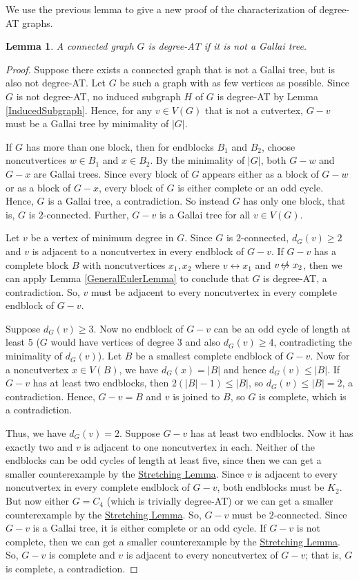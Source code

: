 \documentclass[12pt]{article}
\theoremstyle{plain}
\newtheorem{lem}[thm]{Lemma}
\theoremstyle{definition}
\theoremstyle{remark}
\newcommand{\set}[1]{\left\{ #1 \right\}}
\def\adj{\leftrightarrow}
\def\nonadj{\not\!\leftrightarrow}
\begin{document}
We use the previous lemma to give a new proof of the characterization of
degree-AT graphs.
\begin{lem}
\label{DegreeATClassification}
A connected graph $G$ is degree-AT if it is not a Gallai tree.
\end{lem}
\begin{proof}
Suppose there exists a connected graph that is not a Gallai tree, but is also not
degree-AT.  Let $G$ be such a graph with as few vertices as possible.
Since $G$ is not degree-AT, no induced subgraph $H$ of $G$ is
degree-AT by Lemma \ref{InducedSubgraph}. 
Hence, for any $v \in V(G)$ that is not a cutvertex, $G-v$ must be a Gallai
tree by minimality of $|G|$.  
	
If $G$ has more than one block, then for endblocks $B_1$ and $B_2$, choose
noncutvertices $w\in B_1$ and $x\in B_2$.  By the minimality of $|G|$, both
$G-w$ and $G-x$ are Gallai trees.  Since every block of $G$ appears either as a
block of $G-w$ or as a block of $G-x$, every block of $G$ is either complete or
an odd cycle.  Hence, $G$ is a Gallai tree, a contradiction.  So instead $G$
has only one block, that is, $G$ is $2$-connected.  Further, $G-v$ is a Gallai
tree for all $v \in V(G)$.
	
Let $v$ be a vertex of minimum degree in $G$.  Since $G$ is $2$-connected,
$d_G(v) \ge 2$ and $v$ is adjacent to a noncutvertex in every endblock of $G-v$.
If $G-v$ has a complete block $B$ with noncutvertices $x_1,x_2$ where $v \adj
x_1$ and $v \nonadj x_2$, then we can apply Lemma \ref{GeneralEulerLemma} 
to conclude that $G$ is degree-AT, a
contradiction.  So, $v$ must be adjacent to every noncutvertex in every
complete endblock of $G-v$.
	
Suppose $d_G(v) \ge 3$.  Now no endblock of $G-v$ can be an odd cycle of
length at least $5$ ($G$ would have vertices of degree $3$ and also $d_G(v) \ge
4$, contradicting the minimality of $d_G(v)$).  Let $B$ be a smallest complete
endblock of $G-v$.  Now for a noncutvertex $x \in V(B)$, we have $d_G(x) =
|B|$ and hence $d_G(v) \le |B|$. 
If $G-v$ has at least two endblocks, then $2(|B|-1) \le |B|$, so $d_G(v)
\le |B| = 2$, a contradiction.  Hence, $G-v = B$ and $v$ is joined to $B$, so
$G$ is complete, which is a contradiction.
	
Thus, we have $d_G(v) = 2$.  Suppose $G-v$ has at least two endblocks. 
Now it has exactly two and $v$ is adjacent to one noncutvertex in each. 
Neither of the endblocks can be odd cycles of length at least five, since then
we can get a smaller counterexample by the \hyperref[SubdivideTwice]{Stretching
Lemma}.  Since $v$ is adjacent to every noncutvertex in every
complete endblock of $G-v$, both endblocks must be $K_2$.  But now either
$G=C_4$ (which is trivially degree-AT) or we can get a smaller counterexample
by the \hyperref[SubdivideTwice]{Stretching Lemma}.  So, $G-v$ must be
$2$-connected. Since $G-v$ is a Gallai tree, it is either complete or an odd
cycle.  If $G-v$ is not complete, then we can get a smaller counterexample by
the \hyperref[SubdivideTwice]{Stretching Lemma}.  So, $G-v$ is complete and
$v$ is adjacent to every
noncutvertex of $G-v$; that is, $G$ is complete, a contradiction.
\end{proof}
\end{document}
